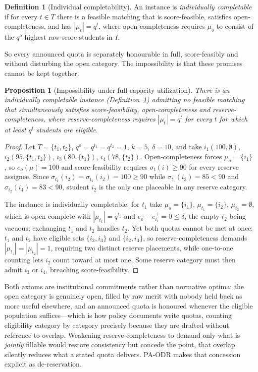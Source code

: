 \documentclass[a4paper,twoside]{article}
\newtheorem{proposition}{Proposition}
\theoremstyle{definition}
\newtheorem{definition}{Definition}
\begin{document}
\begin{definition}[Individual completability]
\label{def:indcomp}
An instance is \emph{individually completable} if for every $t\in T$ there is a feasible matching that is score-feasible, satisfies open-completeness, and has $|\mu_t|=q^t$, where open-completeness requires $\mu_o$ to consist of the $q^o$ highest raw-score students in $I$.
\end{definition}

So every announced quota is separately honourable in full, score-feasibly and without disturbing the open category. The impossibility is that these promises cannot be kept together.

\begin{proposition}[Impossibility under full capacity utilization]
\label{prop:impossibility}
There is an individually completable instance (Definition~\ref{def:indcomp}) admitting no feasible matching that simultaneously satisfies score-feasibility, \emph{open-completeness} and \emph{reserve-completeness}, where reserve-completeness requires $|\mu_t|=q^t$ for every $t$ for which at least $q^t$ students are eligible.
\end{proposition}

\begin{proof}
Let $T=\{t_1,t_2\}$, $q^o=q^{t_1}=q^{t_2}=1$, $k=5$, $\delta=10$, and take $i_1(100,\emptyset)$, $i_2(95,\{t_1,t_2\})$, $i_3(80,\{t_1\})$, $i_4(78,\{t_2\})$. Open-completeness forces $\mu_o=\{i_1\}$, so $e_o(\mu)=100$ and score-feasibility requires $\sigma_t(i)\ge90$ for every reserve assignee. Since $\sigma_{t_1}(i_2)=\sigma_{t_2}(i_2)=100\ge90$ while $\sigma_{t_1}(i_3)=85<90$ and $\sigma_{t_2}(i_4)=83<90$, student $i_2$ is the only one placeable in any reserve category.

The instance is individually completable: for $t_1$ take $\mu_o=\{i_1\}$, $\mu_{t_1}=\{i_2\}$, $\mu_{t_2}=\emptyset$, which is open-complete with $|\mu_{t_1}|=q^{t_1}$ and $e_o-e_{t_1}^+=0\le\delta$, the empty $t_2$ being vacuous; exchanging $t_1$ and $t_2$ handles $t_2$. Yet both quotas cannot be met at once: $t_1$ and $t_2$ have eligible sets $\{i_2,i_3\}$ and $\{i_2,i_4\}$, so reserve-completeness demands $|\mu_{t_1}|=|\mu_{t_2}|=1$, requiring two distinct reserve placements, while one-to-one counting lets $i_2$ count toward at most one. Some reserve category must then admit $i_3$ or $i_4$, breaching score-feasibility.
\end{proof}

Both axioms are institutional commitments rather than normative optima: the open category is genuinely open, filled by raw merit with nobody held back as more useful elsewhere, and an announced quota is honoured whenever the eligible population suffices---which is how policy documents write quotas, counting eligibility category by category precisely because they are drafted without reference to overlap. Weakening reserve-completeness to demand only what is \emph{jointly} fillable would restore consistency but concede the point, that overlap silently reduces what a stated quota delivers. PA-ODR makes that concession explicit as de-reservation.
\end{document}
